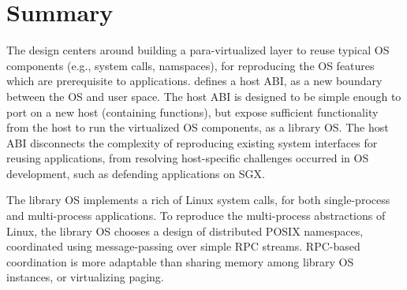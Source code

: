 \section{Summary}
\label{sec:graphene:summary}

The \graphene{} design centers around
building a para-virtualized layer to reuse typical OS components (e.g., system calls, namspaces), for reproducing the OS features which are prerequisite to applications.
\graphene{} defines a host ABI, as a new boundary between the OS and user space.
The host ABI is designed to be simple enough to port on a new host (containing \palcallnum{} functions),
but expose sufficient functionality from the host to run the virtualized OS components, as a library OS.
The host ABI disconnects the complexity of reproducing existing system interfaces for reusing applications,
from resolving host-specific challenges occurred in OS development,
such as defending applications on SGX.


The \graphene{} library OS implements a rich of Linux system calls, for both single-process and multi-process applications.
To reproduce the multi-process abstractions of Linux,
the library OS chooses a design of distributed POSIX namespaces,
coordinated using message-passing over simple RPC streams.
RPC-based coordination is more adaptable than sharing memory among library OS instances, or virtualizing paging.








